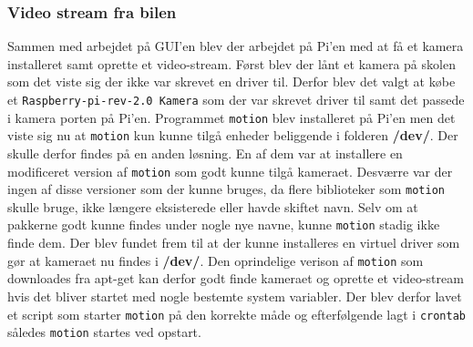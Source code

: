 \subsubsection{Video stream fra bilen}
Sammen med arbejdet på GUI’en blev der arbejdet på Pi’en med at få et kamera installeret samt oprette et video-stream. Først blev der lånt et kamera på skolen som det viste sig der ikke var skrevet en driver til. Derfor blev det valgt at købe et \texttt{Raspberry-pi-rev-2.0 Kamera} som der var skrevet driver til samt det passede i kamera porten på Pi’en. Programmet \texttt{motion} blev installeret på Pi’en men det viste sig nu at \texttt{motion} kun kunne tilgå enheder beliggende i folderen \textbf{\//dev/}. Der skulle derfor findes på en anden løsning. En af dem var at installere en modificeret version af \texttt{motion} \cite{lib:motion-on-raspberry} som godt kunne tilgå kameraet. Desværre var der ingen af disse versioner som der kunne bruges, da flere biblioteker som \texttt{motion} skulle bruge, ikke længere eksisterede eller havde skiftet navn. Selv om at pakkerne godt kunne findes under nogle nye navne, kunne \texttt{motion} stadig ikke finde dem. Der blev fundet frem til at der kunne installeres en virtuel driver \cite{lib:camera-driver} som gør at kameraet nu findes i \textbf{\//dev/}. Den oprindelige verison af \texttt{motion} som downloades fra apt-get kan derfor godt finde kameraet og oprette et video-stream hvis det bliver startet med nogle bestemte system variabler. Der blev derfor lavet et script som starter \texttt{motion} på den korrekte måde og efterfølgende lagt i \texttt{crontab} således \texttt{motion} startes ved opstart. 
